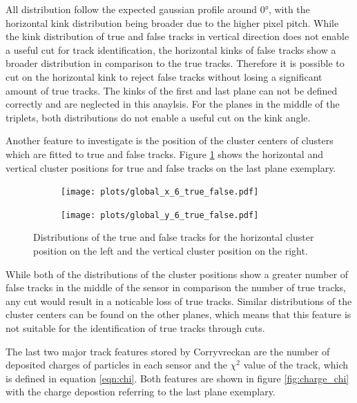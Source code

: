 All distribution follow the expected gaussian profile around 0°, with the horizontal kink distribution being broader due to the higher pixel pitch.
While the kink distribution of true and false tracks in vertical direction does not enable a useful
cut for track identification, the horizontal kinks of false tracks show a broader distribution in comparison to the true tracks. Therefore it is
possible to cut on the horizontal kink to reject false tracks without losing a significant amount of true tracks.
The kinks of the first and last plane can not be defined correctly and are neglected in this anaylsis. For the planes in the middle of the triplets, both
distributions do not enable a useful cut on the kink angle.

Another feature to investigate is the position of the cluster centers of clusters which are fitted to true and false tracks. Figure \ref{fig:clus_pos} shows the
horizontal and vertical cluster positions for true and false tracks on the last plane exemplary.

\begin{figure}
  \hspace{-2.5cm}
  \begin{subfigure}{0.62\textwidth}
      \centering
      \texttt{[image: plots/global\_x\_6\_true\_false.pdf]}
  \end{subfigure}
  \begin{subfigure}{0.62\textwidth}
      \hspace{0.95cm}
      \texttt{[image: plots/global\_y\_6\_true\_false.pdf]}
  \end{subfigure}
  \caption{Distributions of the true and false tracks for the horizontal cluster position on the left and the vertical cluster position on the right.}
  \label{fig:clus_pos}
\end{figure}

While both of the distributions of the cluster positions show a greater number of false tracks in the middle of the sensor in comparison the number of true tracks,
any cut would result in a noticable loss of true tracks. Similar distributions of the cluster centers can be found on the other planes, which means that this feature
is not suitable for the identification of true tracks through cuts.

The last two major track features stored by Corryvreckan are the number of deposited charges of particles in each sensor and the $\chi^2$ value of the track,
which is defined in equation \ref{eqn:chi}.
Both features are shown in figure \ref{fig:charge_chi} with the charge depostion referring to the last plane exemplary.

